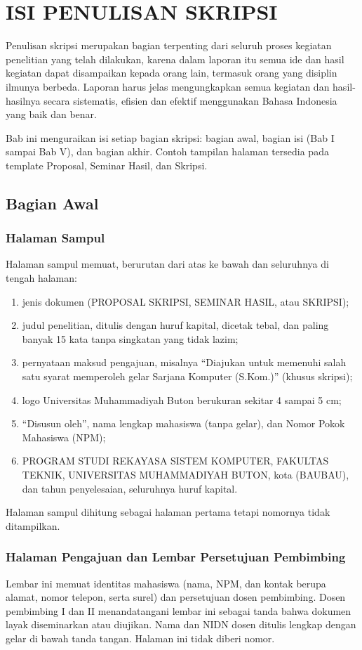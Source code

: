 \chapter{ISI PENULISAN SKRIPSI}

Penulisan skripsi merupakan bagian terpenting dari seluruh proses kegiatan penelitian yang telah dilakukan, karena dalam laporan itu semua ide dan hasil kegiatan dapat disampaikan kepada orang lain, termasuk orang yang disiplin ilmunya berbeda. Laporan harus jelas mengungkapkan semua kegiatan dan hasil-hasilnya secara sistematis, efisien dan efektif menggunakan Bahasa Indonesia yang baik dan benar.

Bab ini menguraikan isi setiap bagian skripsi: bagian awal, bagian isi (Bab I sampai Bab V), dan bagian akhir. Contoh tampilan halaman tersedia pada template Proposal, Seminar Hasil, dan Skripsi.

\section{Bagian Awal}

\subsection{Halaman Sampul}
Halaman sampul memuat, berurutan dari atas ke bawah dan seluruhnya di tengah halaman:
\begin{enumerate}
\item jenis dokumen (PROPOSAL SKRIPSI, SEMINAR HASIL, atau SKRIPSI);
\item judul penelitian, ditulis dengan huruf kapital, dicetak tebal, dan paling banyak 15 kata tanpa singkatan yang tidak lazim;
\item pernyataan maksud pengajuan, misalnya “Diajukan untuk memenuhi salah satu syarat memperoleh gelar Sarjana Komputer (S.Kom.)” (khusus skripsi);
\item logo Universitas Muhammadiyah Buton berukuran sekitar 4 sampai 5 cm;
\item “Disusun oleh”, nama lengkap mahasiswa (tanpa gelar), dan Nomor Pokok Mahasiswa (NPM);
\item PROGRAM STUDI REKAYASA SISTEM KOMPUTER, FAKULTAS TEKNIK, UNIVERSITAS MUHAMMADIYAH BUTON, kota (BAUBAU), dan tahun penyelesaian, seluruhnya huruf kapital.
\end{enumerate}
Halaman sampul dihitung sebagai halaman pertama tetapi nomornya tidak ditampilkan.

\subsection{Halaman Pengajuan dan Lembar Persetujuan Pembimbing}
Lembar ini memuat identitas mahasiswa (nama, NPM, dan kontak berupa alamat, nomor telepon, serta surel) dan persetujuan dosen pembimbing. Dosen pembimbing I dan II menandatangani lembar ini sebagai tanda bahwa dokumen layak diseminarkan atau diujikan. Nama dan NIDN dosen ditulis lengkap dengan gelar di bawah tanda tangan. Halaman ini tidak diberi nomor.

